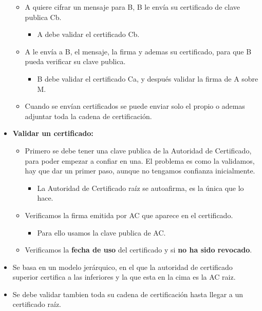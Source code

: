 \documentclass[12pt, twoside, openright]{report} %
\begin{document}
\begin{itemize}
    \begin{itemize}
    \item A quiere cifrar un mensaje para B, B le envía su certificado de
      clave publica Cb.
      

      \begin{itemize}
      \item A debe validar el certificado Cb.
        
      \end{itemize}
    \item A le envía a B, el mensaje, la firma y ademas su certificado, para
      que B pueda verificar su clave publica.
      

      \begin{itemize}
      \item B debe validar el certificado Ca, y después validar la firma de
        A sobre M.
        
      \end{itemize}
    \item Cuando se envían certificados se puede enviar solo el propio o
      ademas adjuntar toda la cadena de certificación.
      
    \end{itemize}
  \item \textbf{Validar un certificado:}
    

    \begin{itemize}
    \item Primero se debe tener una clave publica de la Autoridad de
      Certificado, para poder empezar a confiar en una. El problema es
      como la validamos, hay que dar un primer paso, aunque no tengamos
      confianza inicialmente.
      

      \begin{itemize}
      \item La Autoridad de Certificado raíz se autoafirma, es la única que
        lo hace.
        
      \end{itemize}
    \item Verificamos la firma emitida por AC que aparece en el certificado.
      

      \begin{itemize}
      \item Para ello usamos la clave publica de AC.
        
      \end{itemize}
    \item Verificamos la \textbf{fecha de uso} del certificado y si
      \textbf{no ha sido revocado}.
      
    \end{itemize}
  \item Se basa en un modelo jerárquico, en el que la autoridad de
    certificado superior certifica a las inferiores y la que esta en la
    cima es la AC raiz.
    
  \item Se debe validar tambien toda su cadena de certificación hasta llegar
    a un certificado raíz.
    
  \end{itemize}
\end{document}
